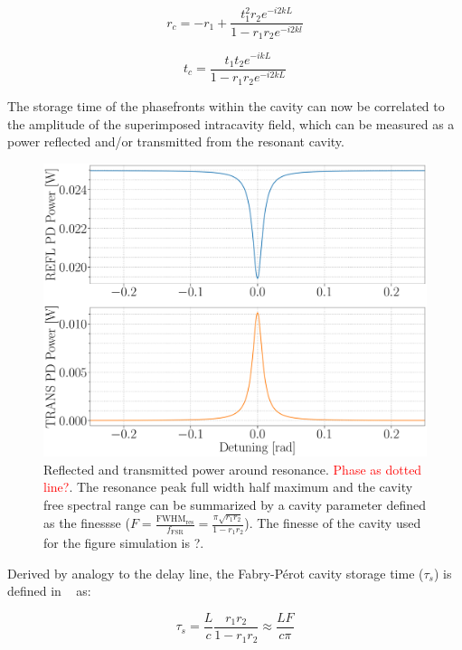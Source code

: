 \begin{equation}
	r_c = -r_1 + \frac{t^2_1r_2 e^{-i2kL}}{1-r_1 r_2 e^{-i2kl}}
\end{equation}

\begin{equation}
	t_c = \frac{t_1 t_2 e^{-ikL}}{1-r_1 r_2 e^{-i2kL}}	
\end{equation}


The storage time of the phasefronts within the cavity can now be correlated to the amplitude of the superimposed intracavity field, which can be measured as a power reflected and/or transmitted from the resonant cavity. 

\begin{figure}[H]
\includegraphics[width=\textwidth]{figs/ALGAAS/DC_power_cav_resonance.pdf}
\caption{Reflected and transmitted power around resonance. \textcolor{red}{Phase as dotted line?}. The resonance peak full width half maximum and the cavity free spectral range can be summarized by a cavity parameter defined as the finessse ($F = \frac{\mathrm{FWHM}_\mathrm{res}}{f_\mathrm{FSR}} = \frac{\pi \sqrt{r_1 r_2}}{1-r_1 r_2}$). The finesse of the cavity used for the figure simulation is ?.}
\label{fig:cav_length_response_DCpow}
\end{figure}

Derived by analogy to the delay line, the Fabry-P\'{e}rot cavity storage time ($\tau_s$) is defined in ~\cite{saulson2017} as:

\begin{equation}
	\tau_s = \frac{L}{c} \frac{r_1r_2}{1-r_1r_2} \approx \frac{L F}{c \pi}
\end{equation}

